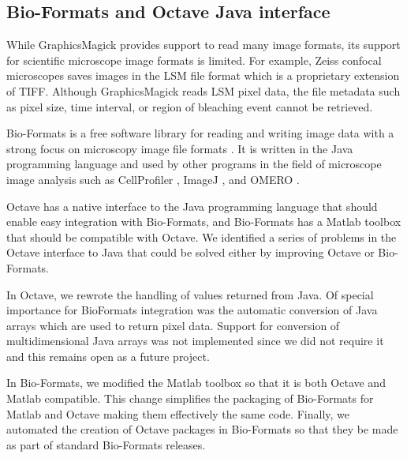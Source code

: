 \subsection{Bio-Formats and Octave Java interface}

While GraphicsMagick provides support to read many image formats, its
support for scientific microscope image formats is limited.
For example, Zeiss confocal microscopes saves
images in the LSM file format which is a proprietary extension of TIFF.
Although GraphicsMagick reads LSM pixel data,
the file metadata such as pixel size, time interval, or region of
bleaching event cannot be retrieved.

Bio-Formats is a free software library for reading and writing image
data with a strong focus on microscopy image file formats
\citep{bioformats}.  It is written in the Java programming language and
used by other programs in the field of microscope image analysis such
as CellProfiler \citep{cellprofiler}, ImageJ \citep{imagej2}, and OMERO
\citep{omero}.

Octave has a native interface to the Java programming language
that should enable easy integration with
Bio-Formats, and Bio-Formats has a Matlab toolbox that should be
compatible with Octave.
We identified a series of problems in the Octave interface to Java that
could be solved either by improving Octave or Bio-Formats.

In Octave, we rewrote the handling of values returned from Java.
Of special importance for BioFormats integration was the automatic conversion of
Java arrays which are used to return pixel data.
Support for conversion of multidimensional Java arrays was not implemented
since we did not require it and this remains open as a future project.

In Bio-Formats, we modified the Matlab toolbox so that it is
both Octave and Matlab compatible.
This change simplifies the packaging of
Bio-Formats for Matlab and Octave making them
effectively the same code.
Finally, we automated the creation of Octave packages in Bio-Formats
so that they be made as part of standard Bio-Formats releases.

